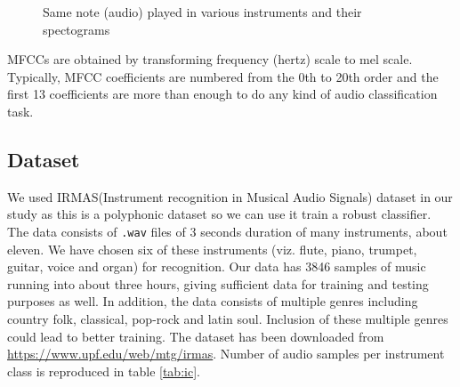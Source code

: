 \documentclass{article}
\begin{document}
\begin{figure}[!htb]
	\caption{Same note (audio) played in various instruments and their spectograms}
	\label{fig:instr}
\end{figure}


MFCCs are obtained by transforming frequency (hertz) scale to mel scale. Typically, MFCC coefficients are numbered from the $0$th to 20th order and the first 13 coefficients are more than enough to do any kind of audio classification task.


\subsection{Dataset}
 We used IRMAS(Instrument recognition in Musical Audio Signals)\cite{bosch2012comparison} dataset in our study as this is a  polyphonic dataset so we can use it train a robust classifier.  The data consists of \texttt{.wav} files of 3 seconds duration of many instruments, about eleven. We have chosen six of these instruments (viz. flute, piano, trumpet, guitar, voice and organ) for recognition. Our data has 3846 samples of music running into about three hours, giving sufficient data for training and testing purposes as well. In addition, the data consists of multiple genres including country folk, classical, pop-rock and latin soul. Inclusion of these multiple genres could lead to better training. 
The dataset has been downloaded from  \url{https://www.upf.edu/web/mtg/irmas}. Number of audio samples per instrument class is reproduced in table \ref{tab:ic}.
\end{document}
